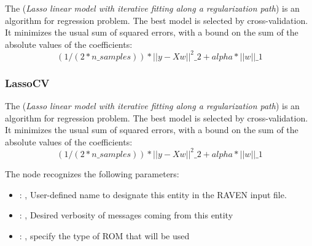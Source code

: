  The  (\textit{Lasso linear model with iterative fitting along a regularization
 path})                         is an algorithm for regression problem. The best model is selected
 by cross-validation.                         It minimizes the usual sum of squared errors, with a
 bound on the sum of the                         absolute values of the coefficients:
 \begin{equation}                          (1 / (2 * n\_samples)) * ||y - Xw||^2\_2 + alpha *
 ||w||\_1                         \end{equation}

\subsubsection{LassoCV}
  The  (\textit{Lasso linear model with iterative fitting along a regularization
  path})                         is an algorithm for regression problem. The best model is selected
  by cross-validation.                         It minimizes the usual sum of squared errors, with a
  bound on the sum of the                         absolute values of the coefficients:
  \begin{equation}                          (1 / (2 * n\_samples)) * ||y - Xw||^2\_2 + alpha *
  ||w||\_1                         \end{equation}

  The  node recognizes the following parameters:
    \begin{itemize}
      \item {}: , 
        User-defined name to designate this entity in the RAVEN input file.
      \item {}: , 
        Desired verbosity of messages coming from this entity
      \item {}: , 
        specify the type of ROM that will be used
  \end{itemize}

